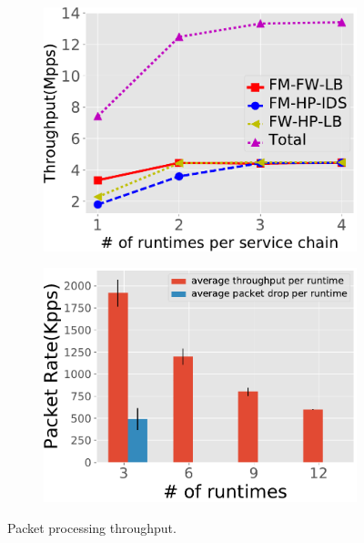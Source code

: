 \begin{figure}[!t]
 \begin{subfigure}[t]{0.49\linewidth}
   \centering
   \includegraphics[width=\columnwidth]{figure/revised-throughput-test.pdf}
   \caption{}\label{fig:normal-case-eval} \end{subfigure}\hfill
  \begin{subfigure}[t]{0.49\linewidth}
   \centering
   \includegraphics[width=\columnwidth]{figure/Mixtest.pdf}
   \caption{}\label{fig:mix-work-flow}
  \end{subfigure}
\caption{ Packet processing throughput.} %
\label{fig:mig-perf}
\end{figure}

